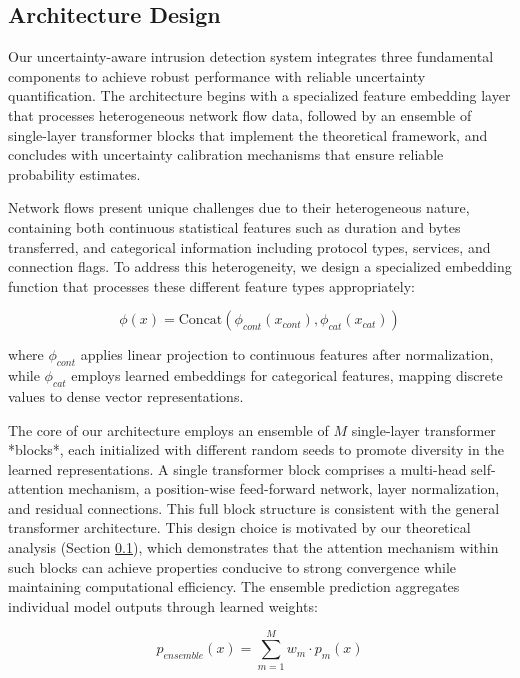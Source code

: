 \documentclass[journal]{IEEEtran}
\begin{document}
\subsection{Architecture Design}
\label{sec:arch_design}

Our uncertainty-aware intrusion detection system integrates three fundamental components to achieve robust performance with reliable uncertainty quantification. The architecture begins with a specialized feature embedding layer that processes heterogeneous network flow data, followed by an ensemble of single-layer transformer blocks that implement the theoretical framework, and concludes with uncertainty calibration mechanisms that ensure reliable probability estimates.

Network flows present unique challenges due to their heterogeneous nature, containing both continuous statistical features such as duration and bytes transferred, and categorical information including protocol types, services, and connection flags. To address this heterogeneity, we design a specialized embedding function that processes these different feature types appropriately:

\begin{equation}
\phi(x) = \text{Concat}(\phi_{cont}(x_{cont}), \phi_{cat}(x_{cat}))
\end{equation}

where $\phi_{cont}$ applies linear projection to continuous features after normalization, while $\phi_{cat}$ employs learned embeddings for categorical features, mapping discrete values to dense vector representations.

The core of our architecture employs an ensemble of $M$ single-layer transformer *blocks*, each initialized with different random seeds to promote diversity in the learned representations. A single transformer block comprises a multi-head self-attention mechanism, a position-wise feed-forward network, layer normalization, and residual connections. This full block structure is consistent with the general transformer architecture. This design choice is motivated by our theoretical analysis (Section \ref{sec:arch_design}), which demonstrates that the attention mechanism within such blocks can achieve properties conducive to strong convergence while maintaining computational efficiency. The ensemble prediction aggregates individual model outputs through learned weights:

\begin{equation}
p_{ensemble}(x) = \sum_{m=1}^M w_m \cdot p_m(x)
\end{equation}
\end{document}
